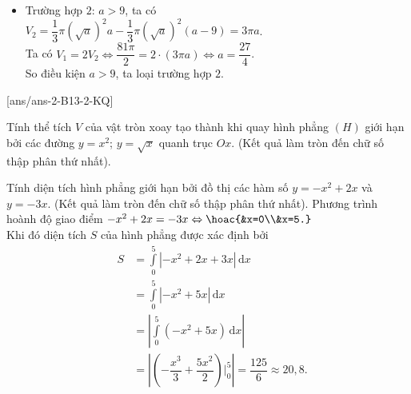 \begin{ex}
{\begin{itemchoice}
\begin{itemize}
	$V_1=\pi\displaystyle\int\limits_0^9\left(\sqrt{x}\right)^2\mathrm{\,d}x=\dfrac{81\pi}{2}$ và $V_2=\dfrac{1}{3}\pi\left(\sqrt{a}\right)^2a+\dfrac{1}{3}\pi\left(\sqrt{a}\right)^2\left(9-a\right)=3\pi a$.\\
	Ta có $V_1=2V_2\Leftrightarrow\dfrac{81\pi}{2}=2\cdot3\pi a\Leftrightarrow a=\dfrac{27}{4}$.\\
	Từ đó suy ra $S=\displaystyle\int\limits_0^{\tfrac{27}{4}}\sqrt{x}\mathrm{\,d}x-\dfrac{1}{2}\cdot\dfrac{27}{4}\cdot\sqrt{\dfrac{27}{4}}=\dfrac{27\sqrt{3}}{16}$.
	\item Trường hợp $2$: $a>9$, ta có\\
	$V_2=\dfrac{1}{3}\pi\left(\sqrt{a}\right)^2a-\dfrac{1}{3}\pi\left(\sqrt{a}\right)^2(a-9)=3\pi a$.\\
	Ta có $V_1=2V_2\Leftrightarrow\dfrac{81\pi}{2}=2\cdot(3\pi a)\Leftrightarrow a=\dfrac{27}{4}$.\\
	So điều kiện $a>9$, ta loại trường hợp $2$.
	\end{itemize}
	\end{itemchoice}
	}
\end{ex}
[ans/ans-2-B13-2-KQ]
\caukq
\begin{ex}%
	Tính thể tích $V$ của vật tròn xoay tạo thành khi quay hình phẳng $(H)$ giới hạn bởi các đường $y=x^2$; $y=\sqrt{x}$ quanh trục $Ox.$ (Kết quả làm tròn đến chữ số thập phân thứ nhất).
\end{ex}
\begin{ex}%
	Tính diện tích hình phẳng giới hạn bởi đồ thị các hàm số $y=-x^2+2x$ và $y=-3x$. (Kết quả làm tròn đến chữ số thập phân thứ nhất).
	\loigiai
	{Phương trình hoành độ giao điểm $-x^2+2x=-3x\Leftrightarrow\hoac{&x=0\\&x=5.}$\\
	Khi đó diện tích $S$ của hình phẳng được xác định bởi
	\begin{eqnarray*}
	&S&=\displaystyle\int \limits_0^5|-x^2+2x+3x|\mathrm{\, d}x\\
	&&=\displaystyle\int\limits_0^5|-x^2+5x|\mathrm{\, d}x\\
	&&=\left| \displaystyle\int\limits_0^5(-x^2+5x)\mathrm{\, d}x\right|\\
	&&=\left| \left(-\dfrac{x^3}{3}+\dfrac{5x^2}{2}\right)\Bigg|_0^5\right| =\dfrac{125}{6}\approx 20{,}8.
	\end{eqnarray*}
	}
\end{ex}
